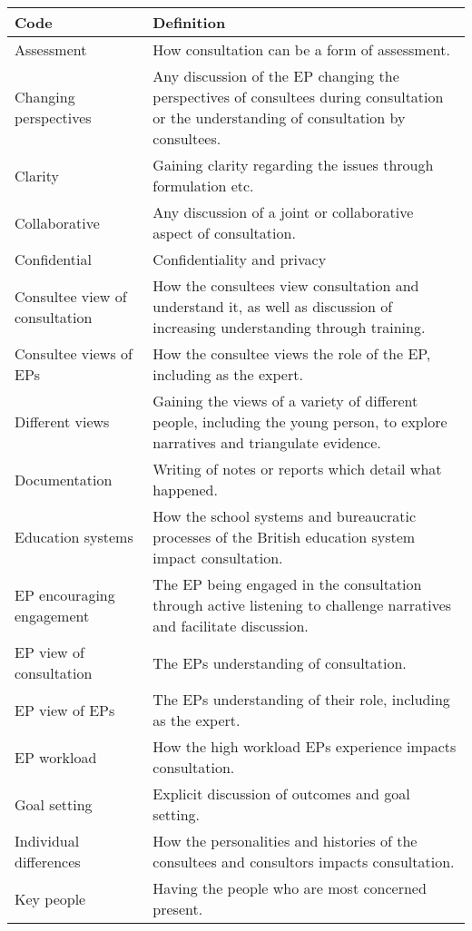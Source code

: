 \documentclass[
]{article}
\begin{document}
\begin{longtable}[]{@{}
  >{\raggedright\arraybackslash}p{}
  >{\raggedright\arraybackslash}p{}@{}}
\toprule
Code & Definition \\
\midrule
\endhead
Assessment & How consultation can be a form of assessment. \\
Changing perspectives & Any discussion of the EP changing the
perspectives of consultees during consultation or the understanding of
consultation by consultees. \\
Clarity & Gaining clarity regarding the issues through formulation
etc. \\
Collaborative & Any discussion of a joint or collaborative aspect of
consultation. \\
Confidential & Confidentiality and privacy \\
Consultee view of consultation & How the consultees view consultation
and understand it, as well as discussion of increasing understanding
through training. \\
Consultee views of EPs & How the consultee views the role of the EP,
including as the expert. \\
Different views & Gaining the views of a variety of different people,
including the young person, to explore narratives and triangulate
evidence. \\
Documentation & Writing of notes or reports which detail what
happened. \\
Education systems & How the school systems and bureaucratic processes of
the British education system impact consultation. \\
EP encouraging engagement & The EP being engaged in the consultation
through active listening to challenge narratives and facilitate
discussion. \\
EP view of consultation & The EPs understanding of consultation. \\
EP view of EPs & The EPs understanding of their role, including as the
expert. \\
EP workload & How the high workload EPs experience impacts
consultation. \\
Goal setting & Explicit discussion of outcomes and goal setting. \\
Individual differences & How the personalities and histories of the
consultees and consultors impacts consultation. \\
Key people & Having the people who are most concerned present. \\

\end{longtable}
\end{document}
